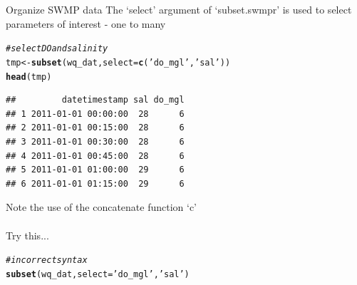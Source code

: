 \documentclass[xcolor=svgnames]{beamer}\usepackage[]{graphicx}\usepackage[]{color}
\makeatletter
\newcommand{\hlstr}[1]{\textcolor[rgb]{0.192,0.494,0.8}{#1}}%
\newcommand{\hlcom}[1]{\textcolor[rgb]{0.678,0.584,0.686}{\textit{#1}}}%
\newcommand{\hlstd}[1]{\textcolor[rgb]{0.345,0.345,0.345}{#1}}%
\newcommand{\hlkwb}[1]{\textcolor[rgb]{0.69,0.353,0.396}{#1}}%
\newcommand{\hlkwc}[1]{\textcolor[rgb]{0.333,0.667,0.333}{#1}}%
\newcommand{\hlkwd}[1]{\textcolor[rgb]{0.737,0.353,0.396}{\textbf{#1}}}%
\newenvironment{kframe}{%
 \def\at@end@of@kframe{}%
 \ifinner\ifhmode%
  \def\at@end@of@kframe{\end{minipage}}%
  \begin{minipage}{\columnwidth}%
 \fi\fi%
 \def\FrameCommand##1{\hskip\@totalleftmargin \hskip-\fboxsep
 \colorbox{shadecolor}{##1}\hskip-\fboxsep
     \hskip-\linewidth \hskip-\@totalleftmargin \hskip\columnwidth}%
 \MakeFramed {\advance\hsize-\width
   \@totalleftmargin\z@ \linewidth\hsize
   \@setminipage}}%
 {\par\unskip\endMakeFramed%
 \at@end@of@kframe}
\newenvironment{knitrout}{}{} %
\makeatother
\begin{document}
\begin{frame}[containsverbatim]{Organize SWMP data}
The `select' argument of `subset.swmpr' is used to select parameters of interest - one to many
\begin{knitrout}\scriptsize
{}\color{fgcolor}\begin{kframe}
\begin{alltt}
\hlcom{# select DO and salinity}
\hlstd{tmp} \hlkwb{<-} \hlkwd{subset}\hlstd{(wq_dat,} \hlkwc{select} \hlstd{=} \hlkwd{c}\hlstd{(}\hlstr{'do_mgl'}\hlstd{,} \hlstr{'sal'}\hlstd{))}
\hlkwd{head}\hlstd{(tmp)}
\end{alltt}
\begin{verbatim}
##         datetimestamp sal do_mgl
## 1 2011-01-01 00:00:00  28      6
## 2 2011-01-01 00:15:00  28      6
## 3 2011-01-01 00:30:00  28      6
## 4 2011-01-01 00:45:00  28      6
## 5 2011-01-01 01:00:00  29      6
## 6 2011-01-01 01:15:00  29      6
\end{verbatim}
\end{kframe}
\end{knitrout}
Note the use of the concatenate function `c'\\~\\
Try this...
\begin{knitrout}\scriptsize
{}\color{fgcolor}\begin{kframe}
\begin{alltt}
\hlcom{# incorrect syntax}
\hlkwd{subset}\hlstd{(wq_dat,} \hlkwc{select} \hlstd{=} \hlstr{'do_mgl'}\hlstd{,} \hlstr{'sal'}\hlstd{)}
\end{alltt}


{\ttfamily\noindent\bfseries\color{errorcolor}{\#\# Error: subset must be of format \%Y-\%m-\%d \%H:\%M}}\end{kframe}
\end{knitrout}
\end{frame}
\end{document}
